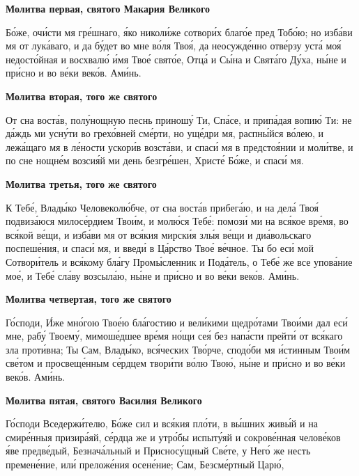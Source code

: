  

\bfseries Молитва первая, святого Макария Великого\normalfont{}


   Бо́же, очи́сти мя гре́шнаго, я́ко николи́же сотвори́х благо́е пред
Тобо́ю; но изба́ви мя от лука́ваго, и да бу́дет во мне во́ля Твоя́, да
неосужде́нно отве́рзу уста́ моя́ недосто́йная и восхвалю́ и́мя Твое́
свято́е, Отца́ и Сы́на и Свята́го Ду́ха, ны́не и при́сно и во ве́ки веко́в.
Ами́нь.




 

\bfseries  Молитва вторая, того же святого\normalfont{}


   От сна воста́в, полу́нощную песнь приношу́ Ти, Спа́се, и припа́дая вопию́
Ти: не да́ждь ми усну́ти во грехо́вней сме́рти, но уще́дри мя, распны́йся
во́лею, и лежа́щаго мя в ле́ности ускори́в возста́ви, и спаси́ мя в предстоя́нии
и моли́тве, и по сне нощне́м возсия́й ми день безгре́шен, Христе́ Бо́же, и
спаси́ мя.



 

\bfseries Молитва третья, того же святого\normalfont{}


   К Тебе́, Влады́ко Человеколю́бче, от сна воста́в прибега́ю, и на дела́ Твоя́
подвиза́юся милосе́рдием Твои́м, и молю́ся Тебе́: помози́ ми на вся́кое вре́мя,
во вся́кой ве́щи, и изба́ви мя от вся́кия мирски́я злы́я ве́щи и диа́вольскаго
поспеше́ния, и спаси́ мя, и введи́ в Ца́рство Твое́ ве́чное. Ты бо еси́ мой
Сотвори́тель и вся́кому бла́гу Промы́сленник и Пода́тель, о Тебе́ же все
упова́ние мое́, и Тебе́ сла́ву возсыла́ю, ны́не и при́сно и во ве́ки веко́в.
Ами́нь.



 

\bfseries Молитва четвертая, того же святого\normalfont{}


   Го́споди, И́же мно́гою Твое́ю бла́гостию и вели́кими щедро́тами Твои́ми
дал еси́ мне, рабу́ Твоему́, мимоше́дшее вре́мя но́щи сея́ без напа́сти прейти́
от вся́каго зла проти́вна; Ты Сам, Влады́ко, вся́ческих Тво́рче, сподо́би мя
и́стинным Твои́м све́том и просвеще́нным се́рдцем твори́ти во́лю Твою́, ны́не
и при́сно и во ве́ки веко́в. Ами́нь.



 

\bfseries Молитва пятая, святого Василия Великого\normalfont{}


   Го́споди Вседержи́телю, Бо́же сил и вся́кия пло́ти, в вы́шних живы́й и на
смире́нныя призира́яй, се́рдца же и утро́бы испыту́яй и сокрове́нная
челове́ков я́ве предве́дый, Безнача́льный и Присносу́щный Све́те, у Него́ же
несть премене́ние, или́ преложе́ния осене́ние; Сам, Безсме́ртный Царю́,

